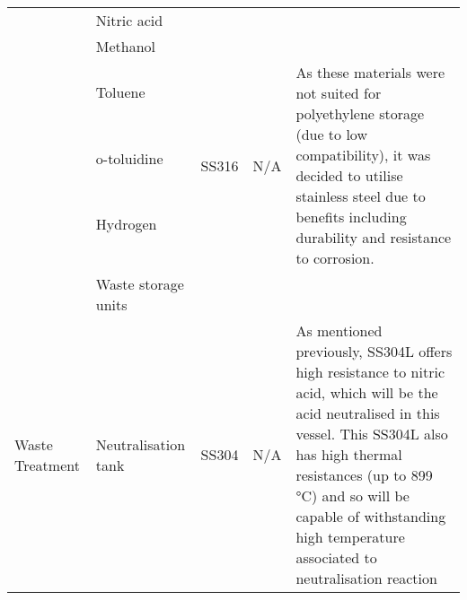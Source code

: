 \begin{table}[H]
\begin{tabular}{@{}p{2cm}|p{3cm}|p{2cm}|p{2cm}|p{5cm}@{}}
                                                      & Nitric acid                         &                                                                                               &                                                    &            \\
                                                      & Methanol                            &                                                 &                              & \\
                                                      & Toluene                                                  &    \multirow{4}{*}{SS316} & \multirow{4}{*}{N/A}                                                       &  \multirow{4}{*}{As these materials were not suited for polyethylene storage (due to low compatibility), it was decided to utilise stainless steel due to benefits including durability and resistance to corrosion.}                                         \\
                                                      & o-toluidine                                              &                                                                                               &                                                    &      \\
                                                      & Hydrogen                                                 &                                                                                               &                                                    &    \\
                                                      &                                                          &                                                                                               &                                                    &                                           \\ 
     & {Waste storage units}                    &                                                                   &                            &                                                                                                                                                         \\ \midrule
    \multirow{3}{*}{Waste Treatment}           & Neutralisation tank                 & SS304              & N/A                                                & As   mentioned previously, SS304L offers high resistance to nitric acid, which   will be the acid neutralised in this vessel. This SS304L also has high   thermal resistances (up to 899 °C) and so will be capable of withstanding high   temperature associated to neutralisation reaction                                                                \\

\end{tabular}
\end{table}
